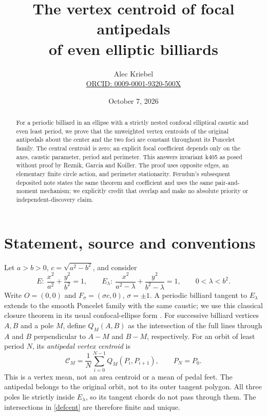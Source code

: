 \documentclass[11pt]{article}
\title{The vertex centroid of focal antipedals\\of even elliptic billiards}
\author{Alec Kriebel\\\small\href{https://orcid.org/0009-0001-9320-500X}{ORCID: 0009-0001-9320-500X}}
\date{October 7, 2026}
\newcommand{\Cent}{\mathcal C}
\begin{document}
\maketitle
\begin{abstract}
For a periodic billiard in an ellipse with a strictly nested confocal
elliptical caustic and even least period, we prove that the unweighted
vertex centroids of the original antipedals about the center and the two
foci are constant throughout its Poncelet family. The central centroid
is zero; an explicit focal coefficient depends only on the axes,
caustic parameter, period and perimeter. This answers invariant k405
as posed without proof by Reznik, Garcia and Koiller. The proof uses
opposite edges, an elementary finite circle action, and perimeter
stationarity. Ferudun's subsequent deposited note states the same
theorem and coefficient and uses the same pair-and-moment mechanism;
we explicitly credit that overlap and make no absolute priority or
independent-discovery claim.
\end{abstract}

\section{Statement, source and conventions}
Let $a>b>0$, $c=\sqrt{a^2-b^2}$, and consider
\[
 E:\ \frac{x^2}{a^2}+\frac{y^2}{b^2}=1,
 \qquad E_\lambda:\ \frac{x^2}{a^2-\lambda}
                  +\frac{y^2}{b^2-\lambda}=1,
 \qquad 0<\lambda<b^2.
\]
Write $O=(0,0)$ and $F_\sigma=(\sigma c,0)$, $\sigma=\pm1$.
A periodic billiard tangent to $E_\lambda$ extends to the smooth
Poncelet family with the same caustic; we use this classical closure
theorem in its usual confocal-ellipse form \cite{Stachel}.
For successive billiard vertices $A,B$ and a pole $M$, define
$Q_M(A,B)$ as the intersection of the full lines through $A$ and $B$
perpendicular to $A-M$ and $B-M$, respectively. For an orbit of least
period $N$, its \emph{antipedal vertex centroid} is
\begin{equation}\label{defcent}
 \Cent_M=\frac1N\sum_{i=0}^{N-1}Q_M(P_i,P_{i+1}),\qquad P_N=P_0.
\end{equation}
This is a vertex mean, not an area centroid or a mean of pedal feet.
The antipedal belongs to the original orbit, not to its outer tangent
polygon. All three poles lie strictly inside $E_\lambda$, so its tangent
chords do not pass through them. The intersections in \eqref{defcent}
are therefore finite and unique.
\end{document}
